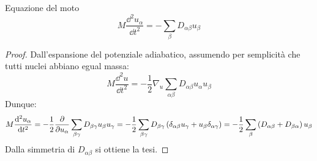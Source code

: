 \begin{proposition}[before upper = {\tcbtitle}]{Equazione del moto}{}
	\begin{equation}
		M \frac{\dd^2 u_\alpha}{\dd t^2} = - \sum_\beta D_{\alpha \beta} u_\beta
	\end{equation}

	\tcblower

	\begin{proof}
		Dall'espansione del potenziale adiabatico, assumendo per semplicità che tutti nuclei abbiano egual massa:
		\begin{equation*}
			M \frac{\dd^2 u}{\dd t^2} = - \frac{1}{2} \nabla_u \sum_{\alpha \beta} D_{\alpha \beta} u_\alpha u_\beta
		\end{equation*}
		Dunque:
		\begin{equation*}
			M \frac{\mathrm{d}^2 u_\alpha}{\mathrm{d} t^2} = - \frac{1}{2} \frac{\partial}{\partial u_\alpha} \sum_{\beta \gamma} D_{\beta \gamma} u_\beta u_\gamma = - \frac{1}{2} \sum_{\beta \gamma} D_{\beta \gamma} \left( \delta_{\alpha \beta} u_\gamma + u_\beta \delta_{\alpha \gamma} \right) = - \frac{1}{2} \sum_\beta \left( D_{\alpha \beta} + D_{\beta \alpha} \right) u_\beta
		\end{equation*}
		Dalla simmetria di $ D_{\alpha \beta} $ si ottiene la tesi.
	\end{proof}
\end{proposition}

